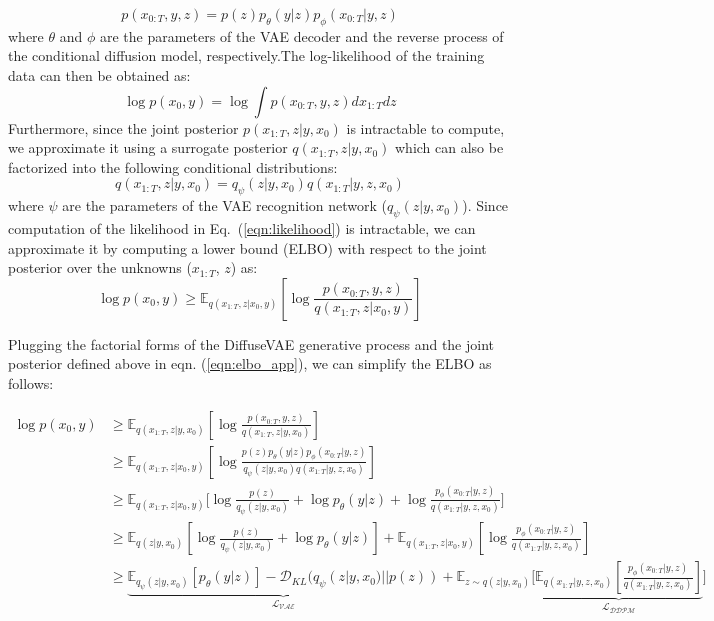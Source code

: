 \documentclass[10pt]{article} \usepackage[accepted]{tmlr}
\begin{document}
\begin{equation}
    p(x_{0:T}, y, z) = p(z)p_{\theta}(y|z)p_{\phi}(x_{0:T}|y, z)
\end{equation}
where $\theta$ and $\phi$ are the parameters of the VAE decoder and the reverse process of the conditional diffusion model, respectively.The log-likelihood of the training data can then be obtained as:
\begin{equation}
    \log{p(x_0, y)} = \log{\int p(x_{0:T}, y, z) dx_{1:T}dz}
    \label{eqn:likelihood}
\end{equation}
Furthermore, since the joint posterior $p(x_{1:T}, z|y, x_0)$ is intractable to compute, we approximate it using a surrogate posterior $q(x_{1:T}, z|y, x_0)$ which can also be factorized into the following conditional distributions:
\begin{equation}
    q(x_{1:T}, z|y, x_0) = q_{\psi}(z|y, x_0)q(x_{1:T} | y, z, x_0)
    \label{eqn:fp_form}
\end{equation}
where $\psi$ are the parameters of the VAE recognition network ($q_{\psi}(z|y, x_0)$). Since computation of the likelihood in Eq.~(\ref{eqn:likelihood}) is intractable, we can approximate it by computing a lower bound (ELBO) with respect to the joint posterior over the unknowns ($x_{1:T}$, $z$) as:
\begin{equation}
    \log{p(x_0, y)} \geq \mathbb{E}_{q(x_{1:T}, z|x_0, y)}\left[\log{\frac{p(x_{0:T}, y, z)}{q(x_{1:T}, z|x_0, y)}}\right]
    \label{eqn:elbo_app}
\end{equation}

Plugging the factorial forms of the DiffuseVAE generative process and the joint posterior defined above in eqn. (\ref{eqn:elbo_app}), we can simplify the ELBO as follows:

\begin{align}
    \log{p(x_0, y)} &\geq \mathbb{E}_{q(x_{1:T}, z|y, x_0)}\left[\log{\frac{p(x_{0:T}, y, z)}{q(x_{1:T}, z|y, x_0)}}\right] \\
    &\geq \mathbb{E}_{q(x_{1:T}, z|x_0, y)}\left[\log{\frac{p(z)p_{\theta}(y|z)p_{\phi}(x_{0:T}|y, z)}{q_{\psi}(z|y, x_0)q(x_{1:T} | y, z, x_0)}}\right] \\
    &\geq \mathbb{E}_{q(x_{1:T}, z|x_0, y)}\Bigg[\log{\frac{p(z)}{q_{\psi}(z|y, x_0)}} + \log{p_{\theta}(y|z)} + \log{\frac{p_{\phi}(x_{0:T}|y, z)}{q(x_{1:T} | y, z, x_0)}}\Bigg] \\
    &\geq \mathbb{E}_{q(z|y, x_0)}\left[\log{\frac{p(z)}{q_{\psi}(z|y, x_0)}} + \log{p_{\theta}(y|z)}\right] + \mathbb{E}_{q(x_{1:T}, z|x_0, y)}\left[\log{\frac{p_{\phi}(x_{0:T}|y, z)}{q(x_{1:T} | y, z, x_0)}}\right]\\
    &\geq \underbrace{\mathbb{E}_{q_{\psi}(z|y, x_0)}\left[p_{\theta}(y|z)\right] - \mathcal{D}_{KL}(q_{\psi}(z|y, x_0) || p(z))}_\mathcal{L_{\text{VAE}}} + \mathbb{E}_{z\sim q(z|y,x_0)}\Bigg[\underbrace{\mathbb{E}_{q(x_{1:T}|y, z, x_0)}\left[\frac{p_{\phi}(x_{0:T}|y, z)}{q(x_{1:T} | y, z, x_0)}\right]}_\mathcal{L_{\text{DDPM}}}\Bigg]
\end{align}
\end{document}
